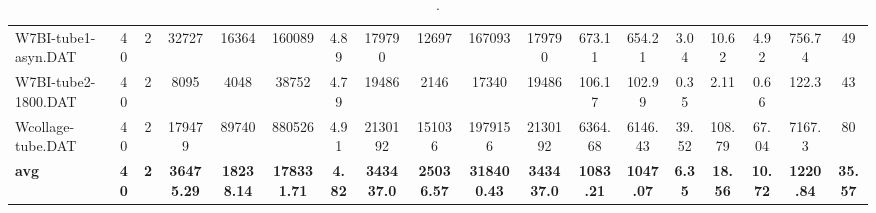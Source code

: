 \begin{sidewaystable}[h]
{\begin{tabular}{lccccccccccccccccc}
W7BI-tube1-asyn.DAT & 40 & 2 & 32727 & 16364 & 160089 & 4.89 & 179790 & 12697 & 167093 & 179790 & 673.11 & 654.21 & 3.04 & 10.62 & 4.92 & 756.74 & 49\\
W7BI-tube2-1800.DAT & 40 & 2 & 8095 & 4048 & 38752 & 4.79 & 19486 & 2146 & 17340 & 19486 & 106.17 & 102.99 & 0.35 & 2.11 & 0.66 & 122.3 & 43\\
Wcollage-tube.DAT & 40 & 2 & 179479 & 89740 & 880526 & 4.91 & 2130192 & 151036 & 1979156 & 2130192 & 6364.68 & 6146.43 & 39.52 & 108.79 & 67.04 & 7167.3 & 80\\
\cline{1-18} \textbf{avg} & \textbf{40} & \textbf{2} & \textbf{36475.29} & \textbf{18238.14} & \textbf{178331.71} & \textbf{4.82} & \textbf{343437.0} & \textbf{25036.57} & \textbf{318400.43} & \textbf{343437.0} & \textbf{1083.21} & \textbf{1047.07} & \textbf{6.35} & \textbf{18.56} & \textbf{10.72} & \textbf{1220.84} & \textbf{35.57} \\ \cline{1-18}
\bottomrule
\end{tabular}%
}%
\caption{.}
\label{tab:table_bc}
\end{sidewaystable}

